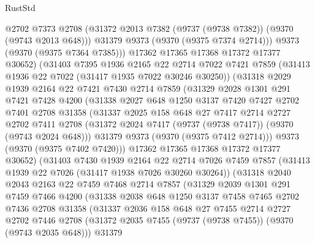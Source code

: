 \begin{lexlean}{RustStd}
\begin{coremodule}
          @2702
          @7373
          @2708
          (@31372 @2013 @7382 (@9737 (@9738 @7382)) (@9370 (@9743 @2013 @648)))
          @31379
          @9373
          (@9370 (@9375 @7374 @2714)))
        @9373
        (@9370 (@9375 @7364 @7385)))
      @17362
      @17365
      @17368
      @17372
      @17377
      @30652)
    (@31403
      @7395
      @1936
      @2165
      @22
      @2714
      @7022
      @7421
      @7859
      (@31413 @1936 @22 @7022 (@31417 @1935 @7022 @30246 @30250))
      (@31318
        @2029
        @1939
        @2164
        @22
        @7421
        @7430
        @2714
        @7859
        (@31329
          @2028
          @1301
          @291
          @7421
          @7428
          @4200
          (@31338
            @2027
            @648
            @1250
            @3137
            @7420
            @7427
            @2702
            @7401
            @2708
            @31358
            (@31337
              @2025
              @158
              @648
              @27
              @7417
              @2714
              @2727
              @2702
              @7411
              @2708
              (@31372 @2024 @7417 (@9737 (@9738 @7417)) (@9370 (@9743 @2024 @648)))
              @31379
              @9373
              (@9370 (@9375 @7412 @2714)))
            @9373
            (@9370 (@9375 @7402 @7420)))
          @17362
          @17365
          @17368
          @17372
          @17377
          @30652)
        (@31403
          @7430
          @1939
          @2164
          @22
          @2714
          @7026
          @7459
          @7857
          (@31413 @1939 @22 @7026 (@31417 @1938 @7026 @30260 @30264))
          (@31318
            @2040
            @2043
            @2163
            @22
            @7459
            @7468
            @2714
            @7857
            (@31329
              @2039
              @1301
              @291
              @7459
              @7466
              @4200
              (@31338
                @2038
                @648
                @1250
                @3137
                @7458
                @7465
                @2702
                @7436
                @2708
                @31358
                (@31337
                  @2036
                  @158
                  @648
                  @27
                  @7455
                  @2714
                  @2727
                  @2702
                  @7446
                  @2708
                  (@31372 @2035 @7455 (@9737 (@9738 @7455)) (@9370 (@9743 @2035 @648)))
                  @31379

\end{coremodule}
\end{lexlean}
